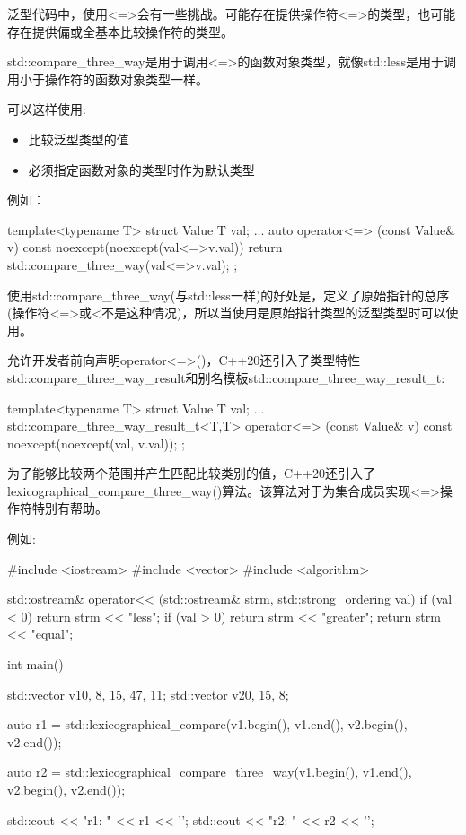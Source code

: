 
泛型代码中，使用<=>会有一些挑战。可能存在提供操作符<=>的类型，也可能存在提供偏或全基本比较操作符的类型。


std::compare\_three\_way是用于调用<=>的函数对象类型，就像std::less是用于调用小于操作符的函数对象类型一样。

可以这样使用:

\begin{itemize}
\item
比较泛型类型的值

\item
必须指定函数对象的类型时作为默认类型
\end{itemize}

例如：

\begin{cpp}
template<typename T>
struct Value {
	T val{};
	...
	auto operator<=> (const Value& v) const noexcept(noexcept(val<=>v.val)) {
		return std::compare_three_way{}(val<=>v.val);
	}
};
\end{cpp}

使用std::compare\_three\_way(与std::less一样)的好处是，定义了原始指针的总序(操作符<=>或<不是这种情况)，所以当使用是原始指针类型的泛型类型时可以使用。

允许开发者前向声明operator<=>()，C++20还引入了类型特性std::compare\_three\_way\_result和别名模板std::compare\_three\_way\_result\_t:

\begin{cpp}
template<typename T>
struct Value {
	T val{};
	...
	std::compare_three_way_result_t<T,T>
		operator<=> (const Value& v) const noexcept(noexcept(val, v.val));
};
\end{cpp}


为了能够比较两个范围并产生匹配比较类别的值，C++20还引入了lexicographical\_compare\_three\_way()算法。该算法对于为集合成员实现<=>操作符特别有帮助。

例如:


\begin{cpp}
#include <iostream>
#include <vector>
#include <algorithm>

std::ostream& operator<< (std::ostream& strm, std::strong_ordering val)
{
	if (val < 0) return strm << "less";
	if (val > 0) return strm << "greater";
	return strm << "equal";
}

int main()
{
	std::vector v1{0, 8, 15, 47, 11};
	std::vector v2{0, 15, 8};

	auto r1 = std::lexicographical_compare(v1.begin(), v1.end(),
										   v2.begin(), v2.end());

	auto r2 = std::lexicographical_compare_three_way(v1.begin(), v1.end(),
													 v2.begin(), v2.end());

	std::cout << "r1: " << r1 << '\n';
	std::cout << "r2: " << r2 << '\n';
}
\end{cpp}


